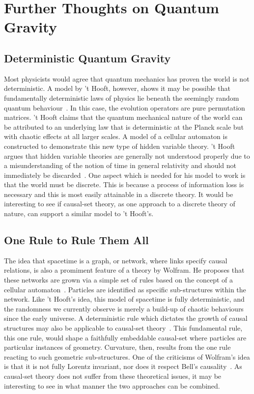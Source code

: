 \documentclass[a4paper,12pt]{article}
\numberwithin{equation}{section}
\begin{document}
\section{Further Thoughts on Quantum Gravity}
\label{sec:Further Thoughts on Quantum Gravity}
\subsection{Deterministic Quantum Gravity}
\label{sec:Deterministic Quantum Gravity}

Most physicists would agree that quantum mechanics has proven the world is not deterministic. A model by 't Hooft, however, shows it may be possible that fundamentally deterministic laws of physics lie beneath the seemingly random quantum behaviour~\cite{Hooft1990}. In this case, the evolution operators are pure permutation matrices. 't Hooft claims that the quantum mechanical nature of the world can be attributed to an underlying law that is deterministic at the Planck scale but with chaotic effects at all larger scales. A model of a cellular automaton is constructed to demonstrate this new type of hidden variable theory. 't Hooft argues that hidden variable theories are generally not understood properly due to a misunderstanding of the notion of time in general relativity and should not immediately be discarded~\cite{Hooft1999}. One aspect which is needed for his model to work is that the world must be discrete. This is because a process of information loss is necessary and this is most easily attainable in a discrete theory. It would be interesting to see if causal-set theory, as one approach to a discrete theory of nature, can support a similar model to 't Hooft's.


\subsection{One Rule to Rule Them All}
\label{sec:One Rule to Rule Them All}

The idea that spacetime is a graph, or network, where links specify causal relations, is also a promiment feature of a theory by Wolfram. He proposes that these networks are grown via a simple set of rules based on the concept of a cellular automaton~\cite{Wolfram2002}. Particles are identified as specific sub-structures within the network. Like 't Hooft's idea, this model of spacetime is fully deterministic, and the randomness we currently observe is merely a build-up of chaotic behaviours since the early universe. A deterministic rule which dictates the growth of causal structures may also be applicable to causal-set theory~\cite{Bolognesi2010}. This fundamental rule, this one rule, would shape a faithfully embeddable causal-set where particles are particular instances of geometry. Curvature, then, results from the one rule reacting to such geometric sub-structures. One of the criticisms of Wolfram's idea is that it is not fully Lorentz invariant, nor does it respect Bell's causality~\cite{Aaronson2002}. As causal-set theory does not suffer from these theoretical issues, it may be interesting to see in what manner the two approaches can be combined.
\end{document}
